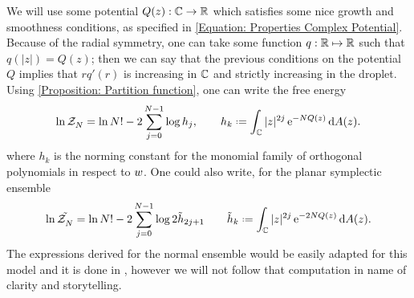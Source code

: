 We will use some potential $Q(z) : \mathbb{C} \rightarrow \mathbb{R}$ 
which satisfies some nice growth and smoothness conditions, as specified in \eqref{Equation: Properties Complex Potential}. Because of the radial symmetry, one can take some function $q: \mathbb{R} \mapsto \mathbb{R}$ such that $q(|z|) = Q(z)$; then we can say that the previous conditions on the potential $Q$ implies that $r q'(r)$ is increasing in $\mathbb{C}$ and strictly increasing in the droplet. Using \eqref{Proposition: Partition function}, one can write the free energy
\begin{equation}
	\ln \pZ{N}{} = \ln{N!} - 2 \sum_{j=0}^{N-1} \log{h_j},  \qquad h_k \deff \int_{\C} |z|^{2j} \ee^{-N Q(z)} \dd A(z).
	\label{Equation: Partition Function}
\end{equation}
where $h_k$ is the norming constant for the monomial family of orthogonal polynomials in respect to $w$. One could also write, for the planar symplectic ensemble 
\begin{equation}
	\ln \tilde{\pZ{N}{}} = \ln{N!} - 2 \sum_{j=0}^{N-1} \log{2 \tilde{h}_{2j + 1}}  \qquad \tilde{h}_k \deff \int_{\C} |z|^{2j} \ee^{- 2 N Q(z)} \dd A(z). 
\end{equation} 
The expressions derived for the normal ensemble would be easily adapted for this model and it is done in \cite{Byun_2023}, however we will not follow that computation in name of clarity and storytelling.

